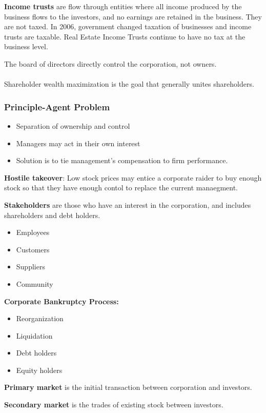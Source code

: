 \documentclass[english, 12pt]{article}
\begin{document}
\begin{defn}
\textbf{Income trusts} are flow through entities where all income produced by the business flows to the investors, and no earnings are retained in the business. They are not taxed. In 2006, government changed taxation of businesses and income trusts are taxable. Real Estate Income Trusts continue to have no tax at the business level.
\end{defn}
The board of directors directly control the corporation, not owners.\\\\
Shareholder wealth maximization is the goal that generally unites shareholders.
\subsubsection*{Principle-Agent Problem}
\begin{itemize}
\item Separation of ownership and control
\item Managers may act in their own interest
\item Solution is to tie management's compensation to firm performance.
\end{itemize}
\begin{defn}
\textbf{Hostile takeover}: Low stock prices may entice a corporate raider to buy enough stock so that they have enough contol to replace the current manaegment.
\end{defn}
\begin{defn}
\textbf{Stakeholders} are those who have an interest in the corporation, and includes shareholders and debt holders.
\begin{itemize}
\item Employees
\item Customers
\item Suppliers
\item Community
\end{itemize}
\end{defn}
\begin{defn}
\textbf{Corporate Bankruptcy Process:}
\begin{itemize}
\item Reorganization
\item Liquidation
\item Debt holders
\item Equity holders
\end{itemize}
\end{defn}
\begin{defn}
\textbf{Primary market} is the initial transaction between corporation and investors.
\end{defn}
\begin{defn}
\textbf{Secondary market} is the trades of existing stock between investors.
\end{defn}
\end{document}
